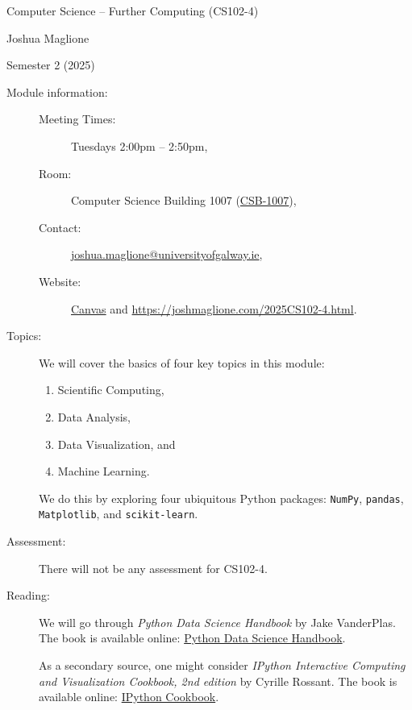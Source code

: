 \documentclass[a4paper, 12pt]{article}
\begin{document}
\pagestyle{empty}

\begin{center}
{\Large Computer Science -- Further Computing (CS102-4)} 

\vspace{0.25cm}

{\large Joshua Maglione}

\vspace{0.25cm}

Semester 2 (2025)
\end{center}

\vspace{0.5cm}

\begin{description}
    \item[Module information:] \hfill
    \begin{description}
      \item[Meeting Times:] Tuesdays 2:00pm -- 2:50pm,
      \item[Room:] Computer Science Building 1007 (\href{https://clients.mapsindoors.com/nuigalwayweb/9167eab0dc78437c93c76b57/details/016a4184bae44d70853a02e5}{CSB-1007}),
      \item[Contact:] \url{joshua.maglione@universityofgalway.ie},
      \item[Website:] \href{https://universityofgalway.instructure.com/}{\textsf{Canvas}} and \url{https://joshmaglione.com/2025CS102-4.html}.
    \end{description} 
    \vspace{1cm}
    \item[Topics:] We will cover the basics of four key topics in this module:
    \begin{enumerate} 
      \item Scientific Computing,
      \item Data Analysis,
      \item Data Visualization, and
      \item Machine Learning.
    \end{enumerate} 
    We do this by exploring four ubiquitous Python packages: \texttt{NumPy},
    \texttt{pandas}, \texttt{Matplotlib}, and \texttt{scikit-learn}.
    \vspace{1cm}
    \item[Assessment:] There will not be any assessment for CS102-4.
    \vspace{1cm}
    \item[Reading:] We will go through \textit{Python Data Science Handbook} by Jake VanderPlas. The book is available online:
    \href{https://jakevdp.github.io/PythonDataScienceHandbook/}{Python Data Science Handbook}. 
    
    As a secondary source, one might consider \textit{IPython Interactive Computing and Visualization Cookbook, 2nd edition} by Cyrille Rossant. The book is available online:
    \href{https://ipython-books.github.io/}{IPython Cookbook}.
\end{description}
\end{document}
